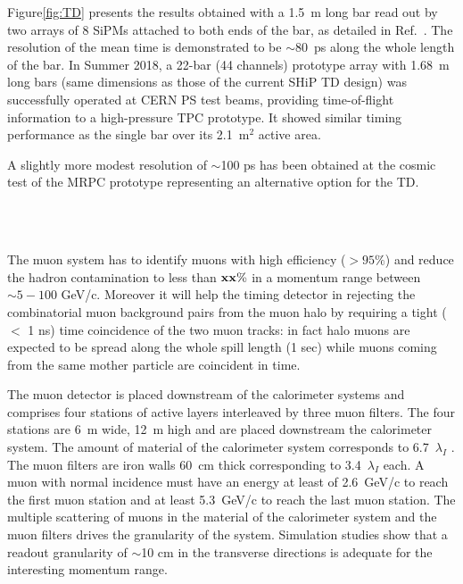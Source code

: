 Figure\ref{fig:TD} presents the results obtained with a 1.5~m long bar read out by two arrays of 8 SiPMs attached to both ends of the bar, as detailed in Ref.~\cite{Betancourt:2017sex}. The resolution of the mean time is demonstrated to be $\sim$80~ps along the whole length of the bar. In Summer 2018, a 22-bar (44 channels) prototype array with 1.68~m long bars (same dimensions as those of the current SHiP TD design) was successfully operated at CERN PS test beams, providing time-of-flight information to a high-pressure TPC prototype. It showed similar timing performance as the single bar over its 2.1~m$ ^2$ active area.

A slightly more modest resolution of $\sim$100 ps has been obtained at the cosmic test of the MRPC prototype representing an alternative option for the TD. 

\\
\noindent

\\
\noindent
The muon system has to identify muons with high efficiency ($> 95\%$) and reduce the hadron contamination to less than ${\bf xx} \%$
in a momentum range between $\sim 5-100 $ GeV/c. Moreover it will help the timing detector in rejecting
the combinatorial muon background pairs from the muon halo by requiring a tight ($<$ 1 ns) time coincidence of the two muon tracks:
in fact halo muons are expected to be spread along the whole spill length (1 sec) while muons coming from the same mother particle
are coincident in time.

The muon detector is placed downstream of the calorimeter systems and comprises four stations of active layers
interleaved by three muon filters.
The four stations are 6~m wide, 12~m high  and are placed downstream the calorimeter system.
The amount of material of the calorimeter system corresponds to { 6.7~$\lambda_I$ }. 
The muon filters are iron walls 60~cm thick corresponding to { 3.4~$\lambda_I$ each}.
A muon with normal incidence must have an energy at least of 2.6~GeV/c to reach the first muon station 
and at least 5.3~GeV/c to reach the last muon station.
The multiple scattering of  muons in the material of the calorimeter system and the muon filters drives the 
granularity of the system. Simulation studies show that a readout granularity of $\sim$10 cm in the transverse directions
is adequate for the interesting momentum range.

